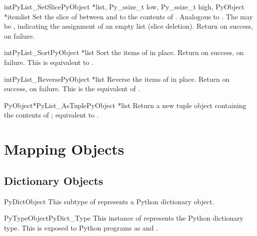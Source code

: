 \begin{cfuncdesc}{int}{PyList_SetSlice}{PyObject *list,
                                        Py_ssize_t low, Py_ssize_t high,
                                        PyObject *itemlist}
  Set the slice of  between  and  to the
  contents of .  Analogous to
  .
  The  may be \NULL{}, indicating the assignment
  of an empty list (slice deletion).
  Return  on success,  on failure.
\end{cfuncdesc}

\begin{cfuncdesc}{int}{PyList_Sort}{PyObject *list}
  Sort the items of  in place.  Return  on
  success,  on failure.  This is equivalent to
  .
\end{cfuncdesc}

\begin{cfuncdesc}{int}{PyList_Reverse}{PyObject *list}
  Reverse the items of  in place.  Return  on
  success,  on failure.  This is the equivalent of
  .
\end{cfuncdesc}

\begin{cfuncdesc}{PyObject*}{PyList_AsTuple}{PyObject *list}
  Return a new tuple object containing the contents of ;
  equivalent to .
\end{cfuncdesc}


\section{Mapping Objects \label{mapObjects}}



\subsection{Dictionary Objects \label{dictObjects}}

\begin{ctypedesc}{PyDictObject}
  This subtype of  represents a Python dictionary
  object.
\end{ctypedesc}

\begin{cvardesc}{PyTypeObject}{PyDict_Type}
  This instance of  represents the Python
  dictionary type.  This is exposed to Python programs as
   and .
\end{cvardesc}

